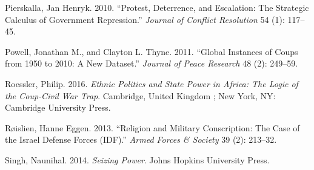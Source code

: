 \documentclass[
  12pt,
]{article}
\newlength{\cslhangindent}
\newenvironment{cslreferences}%
  {\setlength{\parindent}{0pt}%
  \everypar{\setlength{\hangindent}{\cslhangindent}}\ignorespaces}%
  {\par}
\begin{document}
\begin{cslreferences}
\leavevmode\hypertarget{ref-Pierskalla2010}{}%
Pierskalla, Jan Henryk. 2010. ``Protest, Deterrence, and Escalation: The Strategic Calculus of Government Repression.'' \emph{Journal of Conflict Resolution} 54 (1): 117--45.

\leavevmode\hypertarget{ref-Powell2011}{}%
Powell, Jonathan M., and Clayton L. Thyne. 2011. ``Global Instances of Coups from 1950 to 2010: A New Dataset.'' \emph{Journal of Peace Research} 48 (2): 249--59.

\leavevmode\hypertarget{ref-Roessler2016}{}%
Roessler, Philip. 2016. \emph{Ethnic Politics and State Power in Africa: The Logic of the Coup-Civil War Trap}. Cambridge, United Kingdom ; New York, NY: Cambridge University Press.

\leavevmode\hypertarget{ref-Roislien2013}{}%
Røislien, Hanne Eggen. 2013. ``Religion and Military Conscription: The Case of the Israel Defense Forces (IDF).'' \emph{Armed Forces \& Society} 39 (2): 213--32.

\leavevmode\hypertarget{ref-Singh2014}{}%
Singh, Naunihal. 2014. \emph{Seizing Power}. Johns Hopkins University Press.
\end{cslreferences}
\end{document}
